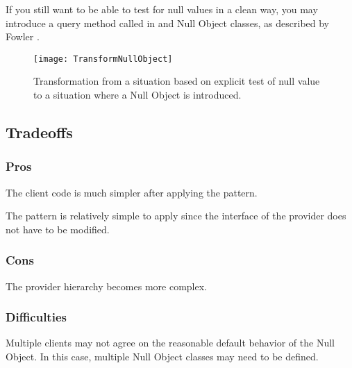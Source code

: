 \documentclass[a4paper,10pt,twoside]{book}
\begin{document}
If you still want to be able to test for null values in a clean way, you may introduce a query method called  in  and Null Object classes, as described by Fowler \cite{Fowl99a}. 

\begin{figure}
\begin{center}
\texttt{[image: TransformNullObject]}
\caption{Transformation from a situation based on explicit test of null value to a situation where a Null Object is introduced.}
\end{center}
\end{figure}

\subsection*{Tradeoffs}

\subsubsection*{Pros}

\begin{bulletlist}
\item The client code is much simpler after applying the pattern.

\item The pattern is relatively simple to apply since the interface of the provider does not have to be modified.
\end{bulletlist}

\subsubsection*{Cons}

\begin{bulletlist}
\item The provider hierarchy becomes more complex.
\end{bulletlist}

\subsubsection*{Difficulties}

\begin{bulletlist}
\item Multiple clients may not agree on the reasonable default behavior of the Null Object. In this case, multiple Null Object classes may need to be defined. 
\end{bulletlist}
\end{document}
